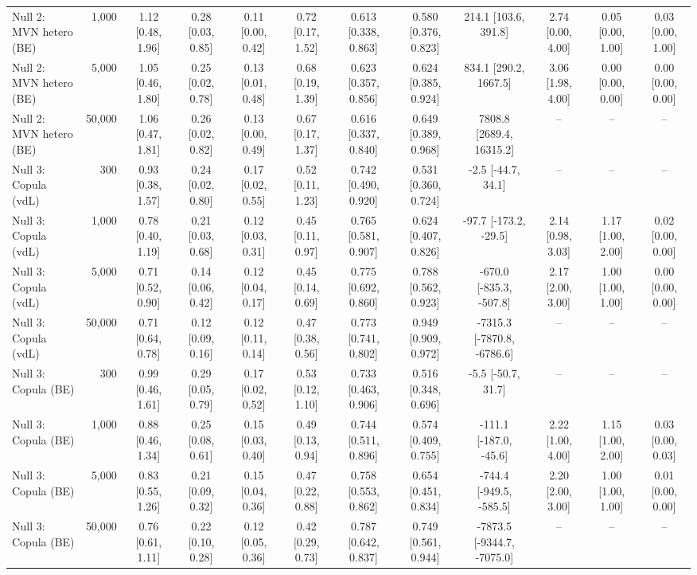 \begin{table}[htbp]
{\begin{tabular}{lrcccccccccc}
Null 2: MVN hetero (BE) & 1,000 & 1.12 [0.48, 1.96] & 0.28 [0.03, 0.85] & 0.11 [0.00, 0.42] & 0.72 [0.17, 1.52] & 0.613 [0.338, 0.863] & 0.580 [0.376, 0.823] & 214.1 [103.6, 391.8] & 2.74 [0.00, 4.00] & 0.05 [0.00, 1.00] & 0.03 [0.00, 1.00] \\
Null 2: MVN hetero (BE) & 5,000 & 1.05 [0.46, 1.80] & 0.25 [0.02, 0.78] & 0.13 [0.01, 0.48] & 0.68 [0.19, 1.39] & 0.623 [0.357, 0.856] & 0.624 [0.385, 0.924] & 834.1 [290.2, 1667.5] & 3.06 [1.98, 4.00] & 0.00 [0.00, 0.00] & 0.00 [0.00, 0.00] \\
Null 2: MVN hetero (BE) & 50,000 & 1.06 [0.47, 1.81] & 0.26 [0.02, 0.82] & 0.13 [0.00, 0.49] & 0.67 [0.17, 1.37] & 0.616 [0.337, 0.840] & 0.649 [0.389, 0.968] & 7808.8 [2689.4, 16315.2] & -- & -- & -- \\
Null 3: Copula (vdL) & 300 & 0.93 [0.38, 1.57] & 0.24 [0.02, 0.80] & 0.17 [0.02, 0.55] & 0.52 [0.11, 1.23] & 0.742 [0.490, 0.920] & 0.531 [0.360, 0.724] & -2.5 [-44.7, 34.1] & -- & -- & -- \\
Null 3: Copula (vdL) & 1,000 & 0.78 [0.40, 1.19] & 0.21 [0.03, 0.68] & 0.12 [0.03, 0.31] & 0.45 [0.11, 0.97] & 0.765 [0.581, 0.907] & 0.624 [0.407, 0.826] & -97.7 [-173.2, -29.5] & 2.14 [0.98, 3.03] & 1.17 [1.00, 2.00] & 0.02 [0.00, 0.00] \\
Null 3: Copula (vdL) & 5,000 & 0.71 [0.52, 0.90] & 0.14 [0.06, 0.42] & 0.12 [0.04, 0.17] & 0.45 [0.14, 0.69] & 0.775 [0.692, 0.860] & 0.788 [0.562, 0.923] & -670.0 [-835.3, -507.8] & 2.17 [2.00, 3.00] & 1.00 [1.00, 1.00] & 0.00 [0.00, 0.00] \\
Null 3: Copula (vdL) & 50,000 & 0.71 [0.64, 0.78] & 0.12 [0.09, 0.16] & 0.12 [0.11, 0.14] & 0.47 [0.38, 0.56] & 0.773 [0.741, 0.802] & 0.949 [0.909, 0.972] & -7315.3 [-7870.8, -6786.6] & -- & -- & -- \\
Null 3: Copula (BE) & 300 & 0.99 [0.46, 1.61] & 0.29 [0.05, 0.79] & 0.17 [0.02, 0.52] & 0.53 [0.12, 1.10] & 0.733 [0.463, 0.906] & 0.516 [0.348, 0.696] & -5.5 [-50.7, 31.7] & -- & -- & -- \\
Null 3: Copula (BE) & 1,000 & 0.88 [0.46, 1.34] & 0.25 [0.08, 0.61] & 0.15 [0.03, 0.40] & 0.49 [0.13, 0.94] & 0.744 [0.511, 0.896] & 0.574 [0.409, 0.755] & -111.1 [-187.0, -45.6] & 2.22 [1.00, 4.00] & 1.15 [1.00, 2.00] & 0.03 [0.00, 0.03] \\
Null 3: Copula (BE) & 5,000 & 0.83 [0.55, 1.26] & 0.21 [0.09, 0.32] & 0.15 [0.04, 0.36] & 0.47 [0.22, 0.88] & 0.758 [0.553, 0.862] & 0.654 [0.451, 0.834] & -744.4 [-949.5, -585.5] & 2.20 [2.00, 3.00] & 1.00 [1.00, 1.00] & 0.01 [0.00, 0.00] \\
Null 3: Copula (BE) & 50,000 & 0.76 [0.61, 1.11] & 0.22 [0.10, 0.28] & 0.12 [0.05, 0.36] & 0.42 [0.29, 0.73] & 0.787 [0.642, 0.837] & 0.749 [0.561, 0.944] & -7873.5 [-9344.7, -7075.0] & -- & -- & -- \\
\bottomrule
\end{tabular}%
}
\end{table}
